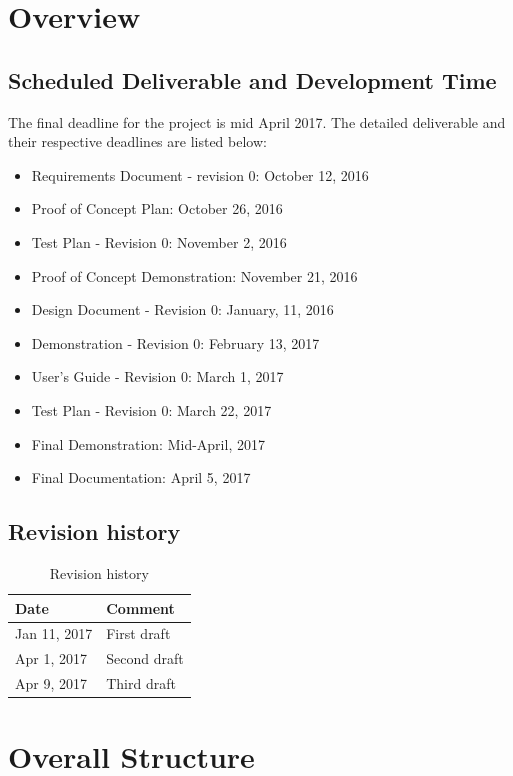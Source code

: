 \documentclass[12pt]{article}
\begin{document}
\section{Overview}

\subsection{Scheduled Deliverable and Development Time}
The final deadline for the project is mid April 2017. The detailed deliverable and their respective deadlines are listed below:
\begin{itemize}
  \item Requirements Document - revision 0: October 12, 2016 
  \item Proof of Concept Plan: October 26, 2016
  \item Test Plan - Revision 0: November 2, 2016
  \item Proof of Concept Demonstration: November 21, 2016
  \item Design Document - Revision 0: January, 11, 2016
  \item Demonstration - Revision 0: February 13, 2017
  \item User’s Guide - Revision 0: March 1, 2017
  \item Test Plan - Revision 0: March 22, 2017
  \item Final Demonstration: Mid-April, 2017
  \item Final Documentation: April 5, 2017
\end{itemize}

\subsection{Revision history}
\begin{table}[H]
\centering
\caption{Revision history}
\label{revision-history}
\begin{tabular}{|l|l|}
\toprule
Date         & Comment     \\ \hline
Jan 11, 2017 & First draft \\ \hline
Apr 1, 2017 & Second draft \\ \hline
Apr 9, 2017 & Third draft \\ \hline
\end{tabular}
\end{table}
\newpage

\section{Overall Structure}
\end{document}
